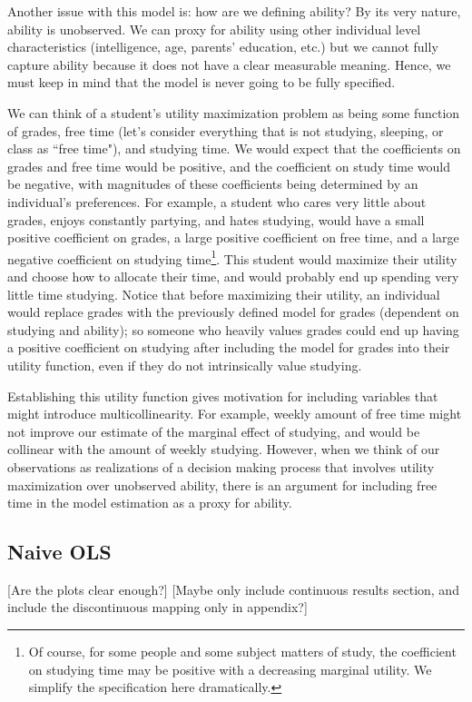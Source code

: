 \documentclass[12pt]{article}
\begin{document}
Another issue with this model is: how are we defining ability? By its very nature, ability is unobserved. We can proxy for ability using other individual level characteristics (intelligence, age, parents' education, etc.) but we cannot fully capture ability because it does not have a clear measurable meaning. Hence, we must keep in mind that the model is never going to be fully specified.

We can think of a student's utility maximization problem as being some function of grades, free time (let's consider everything that is not studying, sleeping, or class as ``free time"), and studying time. We would expect that the coefficients on grades and free time would be positive, and the coefficient on study time would be negative, with magnitudes of these coefficients being determined by an individual's preferences. For example, a student who cares very little about grades, enjoys constantly partying, and hates studying, would have a small positive coefficient on grades, a large positive coefficient on free time, and a large negative coefficient on studying time\footnote{Of course, for some people and some subject matters of study, the coefficient on studying time may be positive with a decreasing marginal utility. We simplify the specification here dramatically.}. This student would maximize their utility and choose how to allocate their time, and would probably end up spending very little time studying. Notice that before maximizing their utility, an individual would replace grades with the previously defined model for grades (dependent on studying and ability); so someone who heavily values grades could end up having a positive coefficient on studying after including the model for grades into their utility function, even if they do not intrinsically value studying.

Establishing this utility function gives motivation for including variables that might introduce multicollinearity. For example, weekly amount of free time might not improve our estimate of the marginal effect of studying, and would be collinear with the amount of weekly studying. However, when we think of our observations as realizations of a decision making process that involves utility maximization over unobserved ability, there is an argument for including free time in the model estimation as a proxy for ability.

\subsection{Naive OLS}
\textcolor{BrickRed}{[Are the plots clear enough?]} \textcolor{BrickRed}{[Maybe only include continuous results section, and include the discontinuous mapping only in appendix?]}
\end{document}
